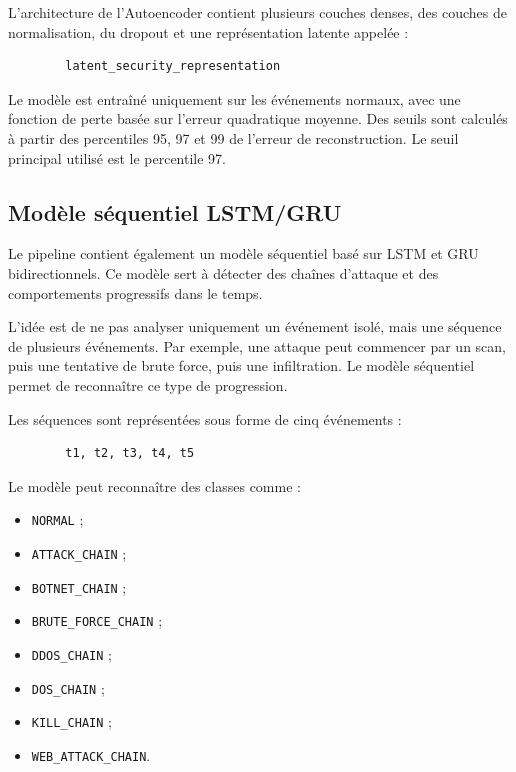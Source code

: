 \documentclass[12pt,a4paper,oneside]{report}
\begin{document}
	L'architecture de l'Autoencoder contient plusieurs couches denses, des couches de normalisation, du dropout et une représentation latente appelée :
	
	\begin{lstlisting}
		latent_security_representation
	\end{lstlisting}
	
	Le modèle est entraîné uniquement sur les événements normaux, avec une fonction de perte basée sur l'erreur quadratique moyenne. Des seuils sont calculés à partir des percentiles 95, 97 et 99 de l'erreur de reconstruction. Le seuil principal utilisé est le percentile 97.
	
	\subsection{Modèle séquentiel LSTM/GRU}
	
	Le pipeline contient également un modèle séquentiel basé sur LSTM et GRU bidirectionnels. Ce modèle sert à détecter des chaînes d'attaque et des comportements progressifs dans le temps.
	
	L'idée est de ne pas analyser uniquement un événement isolé, mais une séquence de plusieurs événements. Par exemple, une attaque peut commencer par un scan, puis une tentative de brute force, puis une infiltration. Le modèle séquentiel permet de reconnaître ce type de progression.
	
	Les séquences sont représentées sous forme de cinq événements :
	
	\begin{lstlisting}
		t1, t2, t3, t4, t5
	\end{lstlisting}
	
	Le modèle peut reconnaître des classes comme :
	
	\begin{itemize}
		\item \texttt{NORMAL} ;
		\item \texttt{ATTACK\_CHAIN} ;
		\item \texttt{BOTNET\_CHAIN} ;
		\item \texttt{BRUTE\_FORCE\_CHAIN} ;
		\item \texttt{DDOS\_CHAIN} ;
		\item \texttt{DOS\_CHAIN} ;
		\item \texttt{KILL\_CHAIN} ;
		\item \texttt{WEB\_ATTACK\_CHAIN}.
	\end{itemize}
	
\end{document}
